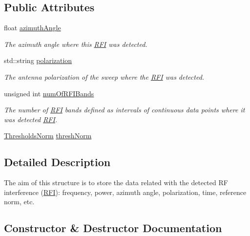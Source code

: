\subsection*{Public Attributes}
\begin{DoxyCompactItemize}
\item 
\mbox{\label{structRFI_aeb10ac61d7897dbaa6971607e56ea244}} 
float \hyperlink{structRFI_aeb10ac61d7897dbaa6971607e56ea244}{azimuth\+Angle}
\begin{DoxyCompactList}\small\item\em The azimuth angle where this \hyperlink{structRFI}{R\+FI} was detected. \end{DoxyCompactList}\item 
\mbox{\label{structRFI_a6c5345dd1141e8bf80b4e1cf32c092de}} 
std\+::string \hyperlink{structRFI_a6c5345dd1141e8bf80b4e1cf32c092de}{polarization}
\begin{DoxyCompactList}\small\item\em The antenna polarization of the sweep where the \hyperlink{structRFI}{R\+FI} was detected. \end{DoxyCompactList}\item 
\mbox{\label{structRFI_aefedd07c1a853fb1c8363a0f436d3973}} 
unsigned int \hyperlink{structRFI_aefedd07c1a853fb1c8363a0f436d3973}{num\+Of\+R\+F\+I\+Bands}
\begin{DoxyCompactList}\small\item\em The number of \hyperlink{structRFI}{R\+FI} bands defined as intervals of continuous data points where it was detected \hyperlink{structRFI}{R\+FI}. \end{DoxyCompactList}\item 
\hyperlink{structRFI_a18cfa7d24274bbcd14acc6b513860cb0}{Thresholds\+Norm} \hyperlink{structRFI_a48905b3dcebf7127bd31315a21a24599}{thresh\+Norm}
\end{DoxyCompactItemize}


\subsection{Detailed Description}
The aim of this structure is to store the data related with the detected RF interference (\hyperlink{structRFI}{R\+FI})\+: frequency, power, azimuth angle, polarization, time, reference norm, etc. 

\subsection{Constructor \& Destructor Documentation}
\mbox{\label{structRFI_a82852dbeab11484c90d4b339f63aefa9}} 
